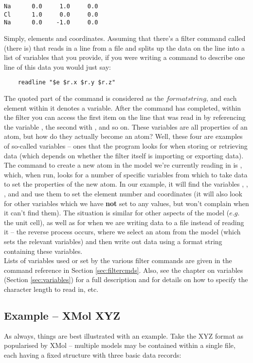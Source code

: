 \begin{verbatim}
Na      0.0     1.0     0.0
Cl      1.0     0.0     0.0
Na      0.0    -1.0     0.0
\end{verbatim}

Simply, elements and coordinates. Assuming that there's a filter command called  (there is) that reads in a line from a file and splits up the data on the line into a list of variables that you provide, if you were writing a command to describe one line of this data you would just say:

\begin{verbatim}
	readline "$e $r.x $r.y $r.z"
\end{verbatim}

The quoted part of the command is considered as the $format string$, and each element within it denotes a variable. After the command has completed, within the filter you can access the first item on the line that was read in by referencing the variable , the second with , and so on. These variables are all properties of an atom, but how do they actually become an atom? Well, these four are examples of so-called  variables -- ones that the program looks for when storing or retrieving data (which depends on whether the filter itself is importing or exporting data). The command to create a new atom in the model we're currently reading in is , which, when run, looks for a number of specific variables from which to take data to set the properties of the new atom. In our example, it will find the variables , , , and  and use them to set the element number and coordinates (it will also look for other variables which we have \textbf{not} set to any values, but won't complain when it can't find them). The situation is similar for other aspects of the model ($e.g.$ the unit cell), as well as for when we are writing data to a file instead of reading it -- the reverse process occurs, where we select an atom from the model (which sets the relevant variables) and then write out data using a format string containing these variables. \\

Lists of variables used or set by the various filter commands are given in the command reference in Section \ref{sec:filtercmds}. Also, see the chapter on variables (Section \ref{sec:variables}) for a full description and for details on how to specify the character length to read in, etc.


\subsection{Example -- XMol XYZ}
\label{sec:filterex1}
As always, things are best illustrated with an example. Take the XYZ format as popularised by XMol -- multiple models may be contained within a single file, each having a fixed structure with three basic data records:

